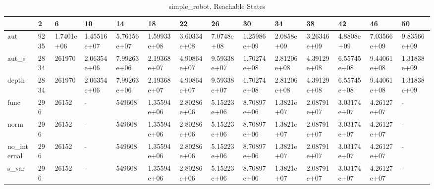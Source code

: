 \begin{table}
\caption{simple_robot, Reachable States}
\label{simple_robot_reach}
\begin{tabular}{llllllllllllll}
\toprule
 & 2 & 6 & 10 & 14 & 18 & 22 & 26 & 30 & 34 & 38 & 42 & 46 & 50 \\
\midrule
aut & 9235 & 1.7401e+06 & 1.45516e+07 & 5.76156e+07 & 1.59933e+08 & 3.60334e+08 & 7.0748e+08 & 1.25986e+09 & 2.0858e+09 & 3.26346e+09 & 4.8808e+09 & 7.03566e+09 & 9.83566e+09 \\
aut_s & 2834 & 261970 & 2.06354e+06 & 7.99263e+06 & 2.19368e+07 & 4.90864e+07 & 9.59338e+07 & 1.70274e+08 & 2.81206e+08 & 4.39129e+08 & 6.55745e+08 & 9.44061e+08 & 1.31838e+09 \\
depth & 2834 & 261970 & 2.06354e+06 & 7.99263e+06 & 2.19368e+07 & 4.90864e+07 & 9.59338e+07 & 1.70274e+08 & 2.81206e+08 & 4.39129e+08 & 6.55745e+08 & 9.44061e+08 & 1.31838e+09 \\
func & 296 & 26152 & - & 549608 & 1.35594e+06 & 2.80286e+06 & 5.15223e+06 & 8.70897e+06 & 1.3821e+07 & 2.08791e+07 & 3.03174e+07 & 4.26127e+07 & - \\
norm & 296 & 26152 & - & 549608 & 1.35594e+06 & 2.80286e+06 & 5.15223e+06 & 8.70897e+06 & 1.3821e+07 & 2.08791e+07 & 3.03174e+07 & 4.26127e+07 & - \\
no_internal & 296 & 26152 & - & 549608 & 1.35594e+06 & 2.80286e+06 & 5.15223e+06 & 8.70897e+06 & 1.3821e+07 & 2.08791e+07 & 3.03174e+07 & 4.26127e+07 & - \\
s_var & 296 & 26152 & - & 549608 & 1.35594e+06 & 2.80286e+06 & 5.15223e+06 & 8.70897e+06 & 1.3821e+07 & 2.08791e+07 & 3.03174e+07 & 4.26127e+07 & - \\
\bottomrule
\end{tabular}
\end{table}
